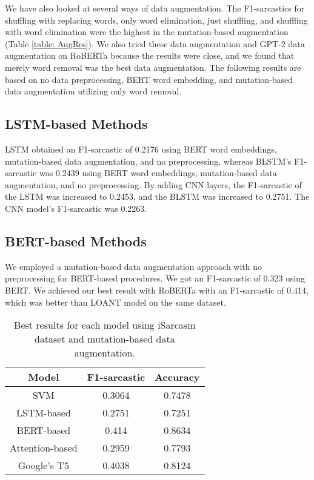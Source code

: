 \documentclass[11pt]{article}
\begin{document}
We have also looked at several ways of data augmentation. The F1-sarcastics for shuffling with replacing words, only word elimination, just shuffling, and shuffling with word elimination were the highest in the mutation-based augmentation (Table \ref{table: AugRes}). We also tried these data augmentation and GPT-2 data augmentation on RoBERTa because the results were close, and we found that merely word removal was the best data augmentation. The following results are based on no data preprocessing, BERT word embedding, and mutation-based data augmentation utilizing only word removal.  

\subsection{LSTM-based Methods}
 LSTM obtained an F1-sarcastic of 0.2176 using BERT word embeddings, mutation-based data augmentation, and no preprocessing, whereas BLSTM's F1-sarcastic was 0.2439 using BERT word embeddings, mutation-based data augmentation, and no preprocessing. By adding CNN layers, the F1-sarcastic of the LSTM was increased to 0.2453, and the BLSTM was increased to 0.2751. The CNN model's F1-sarcastic was 0.2263.

\subsection{BERT-based Methods}
We employed a mutation-based data augmentation approach with no preprocessing for BERT-based procedures. We got an F1-sarcastic of 0.323 using BERT. We achieved our best result with RoBERTa with an F1-sarcastic of 0.414, which was better than LOANT \cite{guo2021latent} model on the same dataset.



\begin{table}
  \caption{Best results for each model using iSarcasm dataset and mutation-based data augmentation.}
  \label{table: Res}
  \begin{center}
  \begin{tabular}{ccc}
    \toprule
    Model & F1-sarcastic & Accuracy\\
    \midrule
    SVM & 0.3064 & 0.7478\\
    \hline
    LSTM-based & 0.2751 & 0.7251\\
    \hline
    BERT-based & 0.414 & 0.8634\\
    \hline
    Attention-based & 0.2959 & 0.7793\\
    \hline
    Google's T5 & 0.4038 & 0.8124\\
    \bottomrule
  \end{tabular}
  \end{center}
\end{table}
\end{document}
